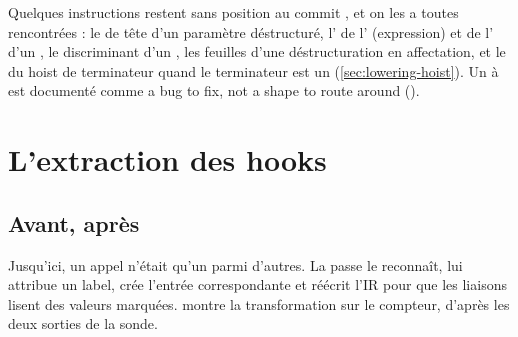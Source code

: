 Quelques instructions restent sans position au commit \snapshotCommit{}, et on les a toutes rencontrées : le  de tête d'un paramètre déstructuré, l' de l' (expression) et de l' d'un , le discriminant d'un , les feuilles d'une déstructuration en affectation, et le  du hoist de terminateur quand le terminateur est un  (\cref{sec:lowering-hoist}). Un  à  est documenté comme \og a bug to fix, not a shape to route around\fg{} ().

\section{L'extraction des hooks}
\label{sec:lowering-hooks}

\subsection{Avant, après}

Jusqu'ici, un appel  n'était qu'un  parmi d'autres. La passe  le reconnaît, lui attribue un label, crée l'entrée  correspondante et réécrit l'IR pour que les liaisons lisent des valeurs marquées.  montre la transformation sur le compteur, d'après les deux sorties de la sonde.

